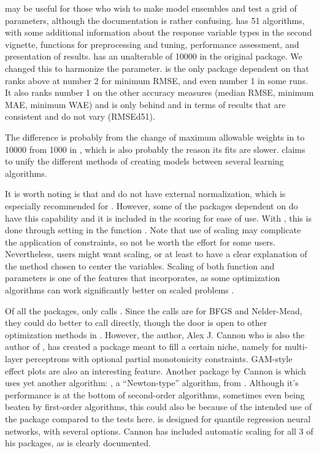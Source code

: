  \citep{R-EnsembleBase} may be useful for those
who wish to make model ensembles and test a grid of parameters, although
the documentation is rather confusing. 
\citep{R-MachineShop} has 51 algorithms, with some additional
information about the response variable types in the second vignette,
functions for preprocessing and tuning, performance assessment, and
presentation of results.  \citep{R-radiant.model}
has an unalterable  of 10000 in the original package. We
changed this to harmonize the  parameter. 
\citep{R-rminer} is the only package dependent on  that ranks
above  at number 2 for minimum RMSE, and even number 1 in some
runs. It also ranks number 1 on the other accuracy measures (median
RMSE, minimum MAE, minimum WAE) and is only behind 
and  in terms of results that are consistent and do not
vary (RMSEd51).

The difference is probably from the change of maximum allowable weights
in  to 10000 from 1000 in , which is also probably
the reason its fits are slower.  \citep{R-traineR}
claims to unify the different methods of creating models between several
learning algorithms.

It is worth noting is that  and  do not have
external normalization, which is especially recommended for
 . However, some of the packages dependent on 
do have this capability and it is included in the scoring for ease of
use. With , this is done through setting
 in the function . Note that use of
scaling may complicate the application of constraints, so not be worth
the effort for some users. Nevertheless, users might want scaling, or at
least to have a clear explanation of the method chosen to center the
variables. Scaling of both function and parameters is one of the
features that  \citep{R-optimx} incorporates, as some
optimization algorithms can work significantly better on scaled problems
\citep{Nash-nlpor14}.

Of all the packages, only  \citep{R-monmlp} calls
. Since the calls are for BFGS and Nelder-Mead, they could
do better to call  directly, though the door is open to
other optimization methods in . However, the author, Alex J.
Cannon who is also the author of , has created a package
meant to fill a certain niche, namely for multi-layer perceptrons with
optional partial monotonicity constraints. GAM-style effect plots are
also an interesting feature. Another package by Cannon is 
\citep{R-qrnn} which uses yet another algorithm: , a
``Newton-type'' algorithm, from . Although it's performance
is at the bottom of second-order algorithms, sometimes even being beaten
by first-order algorithms, this could also be because of the intended
use of the package compared to the tests here.  is designed
for quantile regression neural networks, with several options. Cannon
has included automatic scaling for all 3 of his packages, as is clearly
documented.

